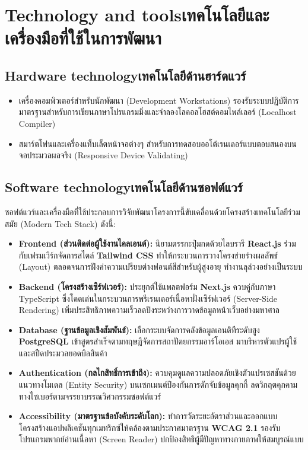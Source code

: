 \section{\ifenglish Technology and tools\else เทคโนโลยีและเครื่องมือที่ใช้ในการพัฒนา\fi}

\subsection{\ifenglish Hardware technology\else เทคโนโลยีด้านฮาร์ดแวร์\fi}
\begin{itemize}
    \item เครื่องคอมพิวเตอร์สำหรับนักพัฒนา (Development Workstations) รองรับระบบปฏิบัติการมาตรฐานสำหรับการเขียนภาษาโปรแกรมมิ่งและจำลองโลคอลโฮสต์คอมไพล์เลอร์ (Localhost Compiler)
    \item สมาร์ตโฟนและเครื่องแท็บเล็ตหน้าจอต่างๆ สำหรับการทดสอบออโต้เรนเดอร์แบบตอบสนองบนจอประมวลผลจริง (Responsive Device Validating)
\end{itemize}

\subsection{\ifenglish Software technology\else เทคโนโลยีด้านซอฟต์แวร์\fi}
ซอฟต์แวร์และเครื่องมือที่ใช้ประกอบการวิจัยพัฒนาโครงการนี้ขับเคลื่อนด้วยโครงสร้างเทคโนโลยีร่วมสมัย (Modern Tech Stack) ดังนี้:
\begin{itemize}
    \item \textbf{Frontend (ส่วนติดต่อผู้ใช้งานไคลเอนต์):} นิยามตรรกะปุ่มกดด้วยไลบรารี \textbf{React.js} \cite{react2023} ร่วมกับเฟรมเวิร์กจัดการสไตล์ \textbf{Tailwind CSS} \cite{tailwind2023} ทำให้กระบวนการวางโครงข่ายร่างผลลัพธ์ (Layout) ตลอดจนการฝังค่าความเปรียบต่างฟอนต์สีสำหรับผู้สูงอายุ ทำงานลุล่วงอย่างเป็นระบบ
    \item \textbf{Backend (โครงสร้างเซิร์ฟเวอร์):} ประยุกต์ใช้แพลตฟอร์ม \textbf{Next.js} \cite{nextjs2023} ควบคู่กับภาษา TypeScript ซึ่งโดดเด่นในกระบวนการพรีเรนเดอร์เนื้อหาฝั่งเซิร์ฟเวอร์ (Server-Side Rendering) เพิ่มประสิทธิภาพความเร็วลดปิงระหว่างการวาดข้อมูลหน้าเว็บอย่างมหาศาล
    \item \textbf{Database (ฐานข้อมูลเชิงสัมพันธ์):} เลือกระบบจัดการคลังข้อมูลเอนติทีระดับสูง \textbf{PostgreSQL} \cite{postgresql2023} เข้าสูตรสำเร็จตามทฤษฎีจัดการสถาปัตยกรรมอาร์โอเอส \cite{fielding2000} มาบริหารตัวแปรผู้ใช้ และสปีดประมวลยอดบิลสินค้า
    \item \textbf{Authentication (กลไกสิทธิ์การเข้าถึง):} ควบคุมดูแลความปลอดภัยเชิงตัวแปรเซสชันด้วยแนวทางโมเดล (Entity Security) บนเซกเมนต์ป้องกันการดักจับข้อมูลคุกกี้ ลดวิกฤตคุกคามทางไซเบอร์ตามจรรยาบรรณวิศวกรรมซอฟต์แวร์ \cite{pressman2014}
    \item \textbf{Accessibility (มาตรฐานข้อบังคับระดับโลก):} ทำการวัดระยะอัตราส่วนและออกแบบโครงสร้างแอปพลิเคชันทุกเมทริกซ์ให้คล้องตามประกาศมาตรฐาน \textbf{WCAG 2.1} \cite{wcag2023} รองรับโปรแกรมพากย์อ่านเนื้อหา (Screen Reader) ปกป้องสิทธิผู้มีปัญหาทางกายภาพให้สมบูรณ์แบบ
\end{itemize}


